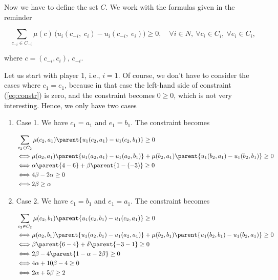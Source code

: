 Now we have to define the set $C$. We work with the formulas given in the reminder

\begin{equation}
\label{eq:constr}
	\sum_{c_{-i} \in C_{-i}} \mu(c) \, \big( u_i(c_{-i}, \; c_i) - u_i(c_{-i}, \; e_i) \big) \geq 0, \quad \forall i \in N, \ \forall c_i \in C_i, \ \forall e_i \in C_i,
\end{equation}

where $c = (c_{-i}, c_i)$, $c_{-i}$.

Let us start with player 1, i.e., $i=1$. Of course, we don't have to consider the cases where $c_1 = e_1$, because in that case the left-hand side of constraint (\ref{eq:constr}) is zero, and the constraint becomes $0 \geq 0$, which is not very interesting. Hence, we only have two cases
\begin{enumerate}
    \item Case 1. We have $c_1 = a_1$ and $e_1 = b_1$. The constraint becomes
    
    \begin{align*}
    & \sum_{c_{2} \in C_{2}} \mu(c_2,a_1) \parent{ u_1(c_{2}, a_1) - u_1(c_{2}, b_1) } \geq 0 \\
    & \Longleftrightarrow
    \mu(a_2,a_1) \parent{ u_1(a_{2}, a_1) - u_1(a_{2}, b_1) }
    +
    \mu(b_2,a_1) \parent{ u_1(b_{2}, a_1) - u_1(b_{2}, b_1) }
    \geq 0 \\
    & \Longleftrightarrow
    \alpha \parent{ 4 - 6 }
    +
    \beta \parent{ 1 - (-3) }
    \geq 0 \\
    & \Longleftrightarrow
    4 \beta - 2 \alpha 
    \geq 0 \\
    & \Longleftrightarrow
    2 \beta \geq \alpha  \\
    \end{align*}
    
    \item Case 2. We have $c_1 = b_1$ and $e_1 = a_1$. The constraint becomes
    
    \begin{align*}
    & \sum_{c_{2} \in C_{2}} \mu(c_2,b_1) \parent{ u_1(c_{2}, b_1) - u_1(c_{2}, a_1) } \geq 0 \\
    & \Longleftrightarrow
    \mu(a_2,b_1) \parent{ u_1(a_{2}, b_1) - u_1(a_{2}, a_1) }
    +
    \mu(b_2,b_1) \parent{ u_1(b_{2}, b_1) - u_1(b_{2}, a_1) }
    \geq 0 \\
    & \Longleftrightarrow
    \beta \parent{ 6 - 4 }
    +
    \delta \parent{ - 3 - 1 }
    \geq 0 \\
    & \Longleftrightarrow
    2 \beta 
    -
    4 \parent{ 1 - \alpha - 2 \beta}
    \geq 0 \\
    & \Longleftrightarrow
    4 \alpha + 10 \beta - 4
    \geq 0 \\
    & \Longleftrightarrow
    2 \alpha + 5 \beta \geq 2 \\
    \end{align*}
    
\end{enumerate}

